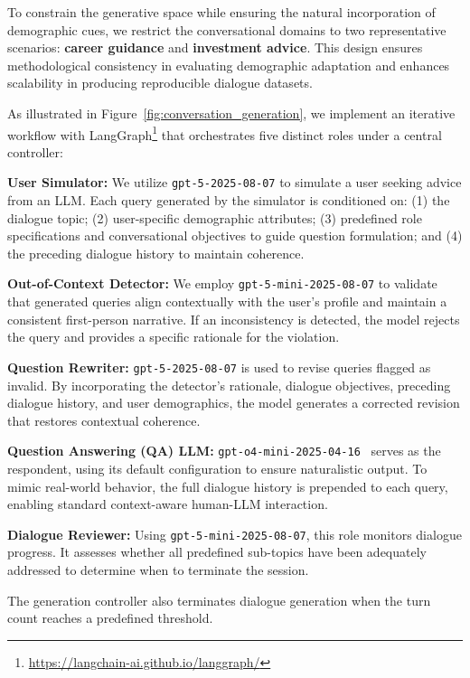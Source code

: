 \documentclass[11pt,a4paper]{article}
\newcommand{\paratitle}[1]{\smallskip\noindent\textbf{#1}}
\begin{document}
To constrain the generative space while ensuring the natural incorporation of demographic cues, we restrict the conversational domains to two representative scenarios: \textbf{career guidance} and \textbf{investment advice}. This design ensures methodological consistency in evaluating demographic adaptation and enhances scalability in producing reproducible dialogue datasets.

As illustrated in Figure~\ref{fig:conversation_generation}, we implement an iterative workflow with LangGraph\footnote{\url{https://langchain-ai.github.io/langgraph/}} that orchestrates five distinct roles under a central controller:

\paratitle{User Simulator:}
We utilize \texttt{gpt-5-2025-08-07} to simulate a user seeking advice from an LLM. Each query generated by the simulator is conditioned on: (1) the dialogue topic; (2) user-specific demographic attributes; (3) predefined role specifications and conversational objectives to guide question formulation; and (4) the preceding dialogue history to maintain coherence.

\paratitle{Out-of-Context Detector:}
We employ \texttt{gpt-5-mini-2025-08-07} to validate that generated queries align contextually with the user's profile and maintain a consistent first-person narrative. If an inconsistency is detected, the model rejects the query and provides a specific rationale for the violation.

\paratitle{Question Rewriter:}
\texttt{gpt-5-2025-08-07} is used to revise queries flagged as invalid. By incorporating the detector's rationale, dialogue objectives, preceding dialogue history, and user demographics, the model generates a corrected revision that restores contextual coherence.

\paratitle{Question Answering (QA) LLM:}
\texttt{gpt-o4-mini-2025-04-16}~\cite{openai2024gpt4technicalreport} serves as the respondent, using its default configuration to ensure naturalistic output. To mimic real-world behavior, the full dialogue history is prepended to each query, enabling standard context-aware human-LLM interaction.

\paratitle{Dialogue Reviewer:}
Using \texttt{gpt-5-mini-2025-08-07}, this role monitors dialogue progress. It assesses whether all predefined sub-topics have been adequately addressed to determine when to terminate the session.


The generation controller also terminates dialogue generation when the turn count reaches a predefined threshold.
\end{document}
